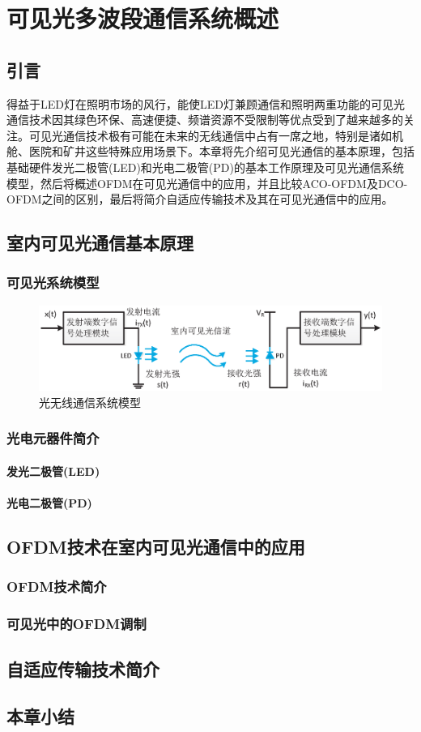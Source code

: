 
\chapter{可见光多波段通信系统概述}
\section{引言}
得益于LED灯在照明市场的风行，能使LED灯兼顾通信和照明两重功能的可见光通信技术因其绿色环保、高速便捷、频谱资源不受限制等优点受到了越来越多的关注。可见光通信技术极有可能在未来的无线通信中占有一席之地，特别是诸如机舱、医院和矿井这些特殊应用场景下。本章将先介绍可见光通信的基本原理，包括基础硬件发光二极管(LED)和光电二极管(PD)的基本工作原理及可见光通信系统模型，然后将概述OFDM在可见光通信中的应用，并且比较ACO-OFDM及DCO-OFDM之间的区别，最后将简介自适应传输技术及其在可见光通信中的应用。
\section{室内可见光通信基本原理}
\subsection{可见光系统模型}
\begin{figure}[htbp]
\centering
\includegraphics[width=\textwidth]{figures/Chapter-2/BasicOpticalSystem.eps}
\caption{光无线通信系统模型}
\label{fig:BasicOpticalSystem}
\end{figure}
\subsection{光电元器件简介}
\subsubsection{发光二极管(LED)}
\subsubsection{光电二极管(PD)}

\section{OFDM技术在室内可见光通信中的应用}
\subsection{OFDM技术简介}
\subsection{可见光中的OFDM调制}
\section{自适应传输技术简介}
\section{本章小结}
